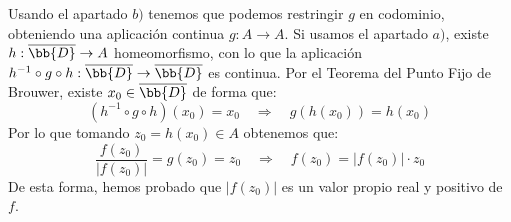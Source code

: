 \begin{ejercicio}
\begin{enumerate}[label=\alph*)]
            Usando el apartado $b)$ tenemos que podemos restringir $g$ en codominio, obteniendo una aplicación continua $g:A\to A$. Si usamos el apartado $a)$, existe $h:\overline{\bb{D}}\to A$ homeomorfismo, con lo que la aplicación $h^{-1}\circ g\circ h:\overline{\bb{D}}\to \overline{\bb{D}}$ es continua. Por el Teorema del Punto Fijo de Brouwer, existe $x_0\in \overline{\bb{D}}$ de forma que:
            \begin{equation*}
                (h^{-1}\circ g\circ h)(x_0) = x_0 \quad\Longrightarrow\quad g(h(x_0)) = h(x_0)
            \end{equation*}
            Por lo que tomando $z_0 = h(x_0)\in A$ obtenemos que:
            \begin{equation*}
                \frac{f(z_0)}{|f(z_0)|} = g(z_0) = z_0 \quad\Longrightarrow\quad f(z_0) =|f(z_0)|\cdot  z_0
            \end{equation*}
            De esta forma, hemos probado que $|f(z_0)|$ es un valor propio real y positivo de $f$.
    \end{enumerate}
\end{ejercicio}

